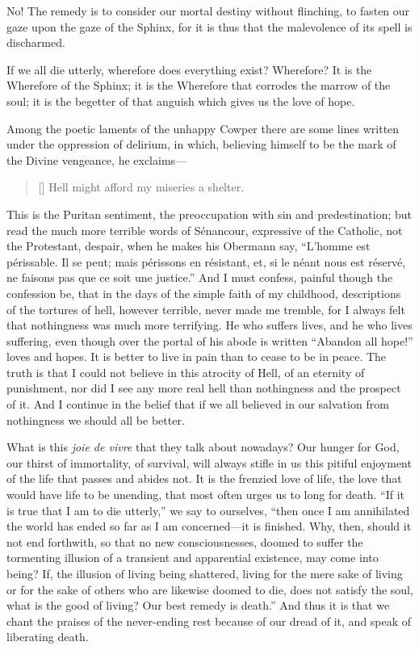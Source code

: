 No! The remedy is to consider our mortal destiny without flinching, to
fasten our gaze upon the gaze of the Sphinx, for it is thus that the
malevolence of its spell is discharmed.

If we all die utterly, wherefore does everything exist? Wherefore? It
is the Wherefore of the Sphinx; it is the Wherefore that corrodes the
marrow of the soul; it is the begetter of that anguish which gives us
the love of hope.

Among the poetic laments of the unhappy Cowper there are some lines
written under the oppression of delirium, in which, believing himself
to be the mark of the Divine vengeance, he exclaims---

\settowidth{}
\begin{verse}[\versewidth]
Hell might afford my miseries a shelter.
\end{verse}

\noindent This is the Puritan sentiment, the preoccupation with sin
and predestination; but read the much more terrible words of
S\'enancour, expressive of the Catholic, not the Protestant, despair,
when he makes his Obermann say, ``L'homme est p\'erissable. Il se
peut; mais p\'erissons en r\'esistant, et, si le n\'eant nous est
r\'eserv\'e, ne faisons pas que ce soit une justice.'' And I must
confess, painful though the confession be, that in the days of the
simple faith of my childhood, descriptions of the tortures of hell,
however terrible, never made me tremble, for I always felt that
nothingness was much more terrifying. He who suffers lives, and he who
lives suffering, even though over the portal of his abode is written
``Abandon all hope!'' loves and hopes. It is better to live in pain
 than to cease to be in peace. The truth is that I could not
believe in this atrocity of Hell, of an eternity of punishment, nor
did I see any more real hell than nothingness and the prospect of it.
And I continue in the belief that if we all believed in our salvation
from nothingness we should all be better.

What is this \textit{joie de vivre} that they talk about nowadays? Our
hunger for God, our thirst of immortality, of survival, will always
stifle in us this pitiful enjoyment of the life that passes and abides
not. It is the frenzied love of life, the love that would have life to
be unending, that most often urges us to long for death. ``If it is
true that I am to die utterly,'' we say to ourselves, ``then once I am
annihilated the world has ended so far as I am con\-cerned---it is
finished. Why, then, should it not end forthwith, so that no new
consciousnesses, doomed to suffer the tormenting illusion of a
transient and apparential existence, may come into being? If, the
illusion of living being shattered, living for the mere sake of living
or for the sake of others who are likewise doomed to die, does not
satisfy the soul, what is the good of living? Our best remedy is
death.'' And thus it is that we chant the praises of the never-ending
rest because of our dread of it, and speak of liberating death.

